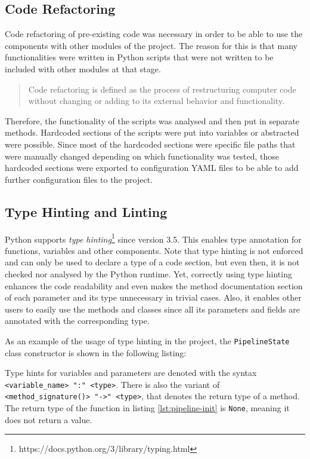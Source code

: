 \documentclass{article}
\begin{document}
    \subsection{Code Refactoring}
    \label{sec:code-refactoring}

        Code refactoring of pre-existing code was necessary in order to be able to use the components with other modules of the project.
        The reason for this is that many functionalities were written in Python scripts that were not written to be included with other modules at that stage.
        \begin{quote}
            Code refactoring is defined as the process of restructuring computer code without changing or adding to its external behavior and functionality.
        \end{quote}
        Therefore, the functionality of the scripts was analysed and then put in separate methods.
        Hardcoded sections of the scripts were put into variables or abstracted were possible. 
        Since most of the hardcoded sections were specific file paths that were manually changed depending on which functionality was tested, those hardcoded sections were exported to configuration YAML files to be able to add further configuration files to the project.


    \subsection{Type Hinting and Linting}
    \label{sec:type-hinting}

        Python supports \emph{type hinting}\footnote{https://docs.python.org/3/library/typing.html} since version 3.5.
        This enables type annotation for functions, variables and other components.
        Note that type hinting is not enforced and can only be used to declare a type of a code section, but even then, it is not checked nor analysed by the Python runtime.
        Yet, correctly using type hinting enhances the code readability and even makes the method documentation section of each parameter and its type unnecessary in trivial cases. Also, it enables other users to easily use the methods and classes since all its parameters and fields are annotated with the corresponding type.

        As an example of the usage of type hinting in the project, the \texttt{PipelineState} class constructor is shown in the following listing:
        
        Type hints for variables and parameters are denoted with the syntax \texttt{<variable\_name> ":" <type>}.
        There is also the variant of \texttt{<method\_signature()> "->" <type>}, that denotes the return type of a method.
        The return type of the function in listing \ref{lst:pipeline-init} is \texttt{None}, meaning it does not return a value.
\end{document}
